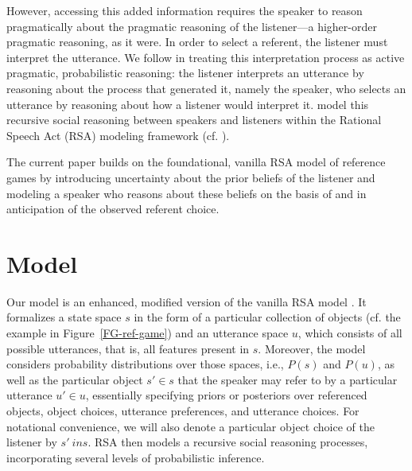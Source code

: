 \documentclass[10pt,a4paper]{article}
\begin{document}
However, accessing this added information requires the speaker to reason pragmatically about the pragmatic reasoning of the listener---a higher-order pragmatic reasoning, as it were.
In order to select a referent, the listener must interpret the utterance. We follow  in treating this interpretation process as active pragmatic, probabilistic reasoning: the listener interprets an utterance by reasoning about the process that generated it, namely the speaker, who selects an utterance by reasoning about how a listener would interpret it. \citeauthor{frankgoodman2012} model this recursive social reasoning between speakers and listeners within the Rational Speech Act (RSA) modeling framework (cf. ).

The current paper builds on the foundational, vanilla RSA model of reference games by introducing uncertainty about the prior beliefs of the listener and modeling a speaker who reasons about these beliefs on the basis of and in anticipation of the observed referent choice. 



\section{Model}
Our model is an enhanced, modified version of the vanilla RSA model \cite{frankgoodman2012}.
It formalizes a state space $s$ in the form of a particular collection of objects (cf. the example in Figure~\ref{FG-ref-game}) and an utterance space $u$,
which consists of all possible utterances, that is, all features present in $s$. 
Moreover, the model considers probability distributions over those spaces, i.e., $P(s)$ and $P(u)$, as well as the particular object $s'\in s$ that the speaker may refer to by a particular utterance $u' \in u$, essentially specifying priors or posteriors over referenced objects, object choices, utterance preferences, and utterance choices. 
For notational convenience, we will also denote a particular object choice of the listener by $s' \ in s$.
RSA then models a recursive social reasoning processes, incorporating several levels of probabilistic inference. 
\end{document}
